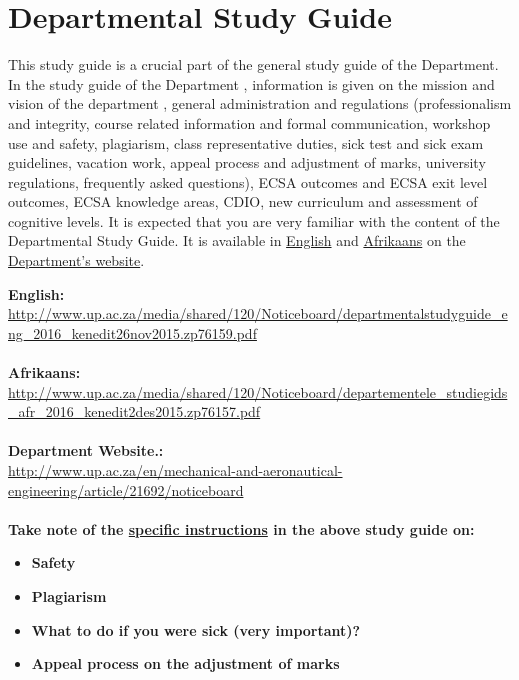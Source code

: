 \section{Departmental Study Guide} \label{sec:dep_study_guide}
    This study guide is a crucial part of the general study guide of the
    Department. In the study guide of the Department , information is given on
    the mission and vision of the department , general administration and
    regulations (professionalism and integrity, course related information and
    formal communication, workshop use and safety, plagiarism, class
    representative duties, sick test and sick exam guidelines, vacation work,
    appeal process and adjustment of marks, university regulations, frequently
    asked questions), ECSA outcomes and ECSA exit level outcomes, ECSA
    knowledge areas, CDIO, new curriculum and assessment of cognitive levels.
    It is expected that you are very familiar with the content of the
    Departmental Study Guide. It is available in
    \href{http://www.up.ac.za/media/shared/120/Noticeboard/departmentalstudyguide_eng_2016_kenedit26nov2015.zp76159.pdf}{English}
    and
    \href{http://www.up.ac.za/media/shared/120/Noticeboard/departementele_studiegids_afr_2016_kenedit2des2015.zp76157.pdf}{Afrikaans}
    on the
    \href{http://www.up.ac.za/en/mechanical-and-aeronautical-engineering/article/21692/noticeboard}{Department’s website}.

    \noindent
    \textbf{English:} \\
    \url{http://www.up.ac.za/media/shared/120/Noticeboard/departmentalstudyguide_eng_2016_kenedit26nov2015.zp76159.pdf} \\~\\
    \textbf{Afrikaans:} \\
    \url{http://www.up.ac.za/media/shared/120/Noticeboard/departementele_studiegids_afr_2016_kenedit2des2015.zp76157.pdf} \\~\\
    \textbf{Department Website.:} \\
    \url{http://www.up.ac.za/en/mechanical-and-aeronautical-engineering/article/21692/noticeboard} \\~\\

    \noindent
    \textbf{Take note of the \uline{specific instructions} in the above study guide on:}
    \begin{itemize}
        \item \textbf{Safety}
        \item \textbf{Plagiarism}
        \item \textbf{What to do if you were sick (very important)?}
        \item \textbf{Appeal process on the adjustment of marks}
    \end{itemize}

